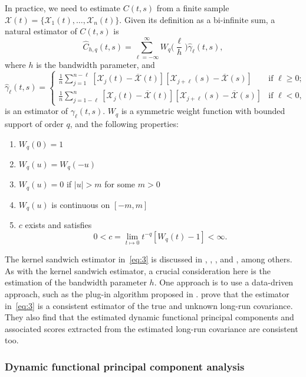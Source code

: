 \documentclass[12pt,a4paper]{article}
\newcommand{\X}{\mathcal{X}}
\begin{document}
In practice, we need to estimate $C(t, s)$ from a finite sample $\bm{\X}(t) = \{\X_1(t), \dots, \X_n(t)\}$. Given its definition as a bi-infinite sum, a natural estimator of $C(t, s)$ is
\begin{equation}
\widehat{C}_{h,q}(t,s) = \sum^{\infty}_{\ell=-\infty}W_q\Big(\frac{\ell}{h}\Big)\widehat{\gamma}_{\ell}(t,s), \label{eq:3}
\end{equation}
where $h$ is the bandwidth parameter, and
\[ \widehat{\gamma}_{\ell}(t,s) = \left\{ \begin{array}{ll}
         \frac{1}{n}\sum_{j=1}^{n-\ell}\left[\X_j(t)-\overline{\X}(t)\right]\left[\X_{j+\ell}(s)-\overline{\X}(s)\right] & \mbox{if $\ell \geq 0$};\\
        \frac{1}{n}\sum_{j=1-\ell}^n\left[\X_j(t)-\overline{\X}(t)\right]\left[\X_{j+\ell}(s)-\overline{\X}(s)\right] & \mbox{if $\ell < 0$},\end{array} \right. \] 
is an estimator of $\gamma_{\ell}(t,s)$. $W_q$ is a symmetric weight function with bounded support of order $q$, and the following properties:
\begin{enumerate}
\item[1)] $W_q(0) = 1$
\item[2)] $W_q(u) = W_q(-u)$
\item[3)] $W_q(u) = 0$ if $|u|>m$ for some $m>0$
\item[4)] $W_q(u)$ is continuous on $[-m, m]$
\item[5)] $c$ exists and satisfies
\begin{equation*}
0<c=\lim_{t\mapsto 0}t^{-q}[W_q(t)-1]<\infty.
\end{equation*} 
\end{enumerate}
The kernel sandwich estimator in~\eqref{eq:3} is discussed in \cite{HKR13}, \cite{PT13}, \cite{RS17}, and \cite{MGG20}, among others. As with the kernel sandwich estimator, a crucial consideration here is the estimation of the bandwidth parameter $h$. One approach is to use a data-driven approach, such as the plug-in algorithm proposed in \cite{RS17}. \cite{RS17} prove that the estimator in~\eqref{eq:3} is a consistent estimator of the true and unknown long-run covariance. They also find that the estimated dynamic functional principal components and associated scores extracted from the estimated long-run covariance are consistent too.

\subsubsection{Dynamic functional principal component analysis}\label{sec:dfpca}
\end{document}
